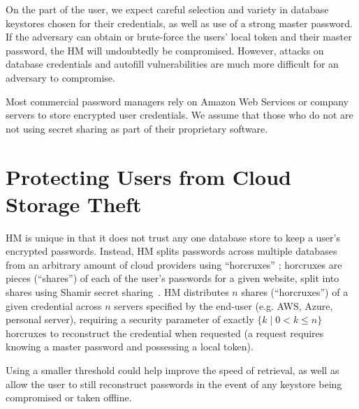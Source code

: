 \documentclass[conference]{IEEEtran}
\begin{document}
On the part of the user, we expect careful selection and variety in database
keystores chosen for their credentials, as well as use of a strong master password.
If the adversary can obtain or brute-force the users' local token and their
master password, the HM will undoubtedly be compromised. 
However, attacks on
database credentials and autofill vulnerabilities are much more difficult for an
adversary to compromise.

Most commercial password managers rely on Amazon Web Services or company servers 
to store encrypted user credentials. We assume that those who do not are not
using secret sharing as part of their proprietary software. 

\section{Protecting Users from Cloud Storage Theft}
HM is unique in that it does not trust any one database store to keep a user's
encrypted passwords. Instead, HM splits passwords across multiple databases from
an arbitrary amount of cloud providers using ``horcruxes'' ; horcruxes are pieces
(``shares'') of each of the user's passwords for a given website, split into
shares using Shamir secret sharing~\cite{shamir1979share}. HM distributes $n$
shares (``horcruxes'') of a given credential across $n$ servers specified by the
end-user (e.g. AWS, Azure, personal server), requiring a security parameter of
exactly $\{k \mid 0 < k\leq n\}$ horcruxes to reconstruct the credential when
requested (a request requires knowing a master password and possessing a local
token). 

Using a smaller threshold could help improve the speed of retrieval, as well as
allow the user to still reconstruct passwords in the event of any keystore being
compromised or taken offline.
\end{document}
